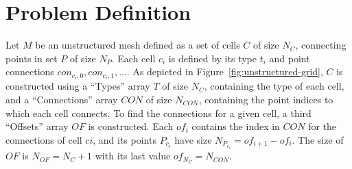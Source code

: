 \documentclass{egpubl}
\begin{document}
\section{Problem Definition}
\label{sec:problem-definition}

Let $M$ be an unstructured mesh defined as a set of cells $C$ of size $N_C$, connecting points in set $P$ of size $N_P$. Each cell $c_i$ is defined by its type $t_i$ and point connections $con_{c_i,0}, con_{c_i,1},\ldots$. As depicted in Figure~\ref{fig:unstructured-grid}, $C$ is constructed using a ``Types'' array $T$ of size $N_C$, containing the type of each cell, and a ``Connections'' array $CON$ of size $N_{CON}$, containing the point indices to which each cell connects. To find the connections for a given cell, a third ``Offsets'' array $OF$ is constructed. Each $of_i$ contains the index in $CON$ for the connections of cell $ci$, and its points $P_{c_i}$ have size $N_{P_{c_i}} = of_{i+1} - of_{i}$. The size of $OF$ is $N_{OF} = N_C+1$ with its last value $of_{N_C} = N_{CON}$.
\end{document}
